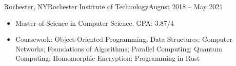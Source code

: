 \begin{cvsubsection}{Rochester, NY}{Rochester Institute of Technology}{August 2018 -- May 2021}
	\begin{itemize}
		\item Master of Science in Computer Science. GPA: 3.87/4
		\item Coursework: Object-Oriented Programming; Data Structures; Computer Networks; Foundations of Algorithms; Parallel Computing; Quantum Computing; Homomorphic Encryption; Programming in Rust
	\end{itemize}
\end{cvsubsection}